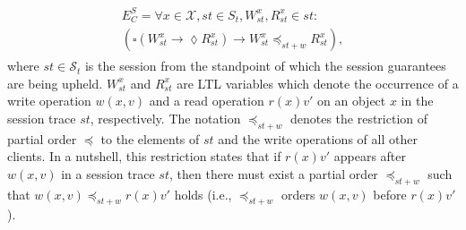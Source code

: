 \documentclass[journal,compsoc]{IEEEtran}
\begin{document}
\begin{align}\label{eqn:RYW}
  \begin{split}
E^S_C =  \forall x \in \mathcal{X}, \mathit{st} \in \mathit{S_t}, W_\mathit{st}^x, R_\mathit{st}^x \in \mathit{st}:
\\ \left( \square \left( W_\mathit{st}^x \rightarrow \lozenge R_\mathit{st}^x \right)
 \rightarrow  W_\mathit{st}^x  \preccurlyeq_{\mathit{st}+w} R_\mathit{st}^x \right),
  \end{split}
  \end{align} where $\mathit{st}\in \mathcal{S}_t$ is the session from the standpoint of which the session guarantees are being upheld.
  $W_\mathit{st}^x$ and $R_\mathit{st}^x$ are LTL variables which denote the occurrence of a write operation $w(x,v)$ and a read operation $r(x){v'}$ on an object $x$ in the session trace $\mathit{st}$, respectively.
  The notation $\preccurlyeq_{\mathit{st}+w}$ denotes the restriction of partial order $\preccurlyeq$ to the elements of $\mathit{st}$ and the write operations of all other clients. %
In a nutshell, this restriction states that if $r(x){v'}$ %
 appears after $w(x,v)$ in a session trace $\mathit{st}$, %
  then there must exist a partial order $\preccurlyeq_{\mathit{st}+w}$ such that $w(x,v) \preccurlyeq_{\mathit{st}+w} r(x){v'}$ holds (i.e., $\preccurlyeq_{\mathit{st}+w}$ orders $w(x,v)$ before $r(x){v'}$).
\end{document}
